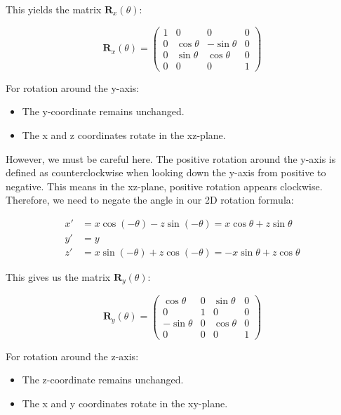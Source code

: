 \documentclass[12pt]{article}
\begin{document}
This yields the matrix $\mathbf{R}_x(\theta)$:

$$
    \mathbf{R}_x(\theta) = \begin{pmatrix}
        1 & 0          & 0           & 0 \\
        0 & \cos\theta & -\sin\theta & 0 \\
        0 & \sin\theta & \cos\theta  & 0 \\
        0 & 0          & 0           & 1
    \end{pmatrix}
$$


For rotation around the y-axis:
\begin{itemize}
    \item The y-coordinate remains unchanged.
    \item The x and z coordinates rotate in the xz-plane.
\end{itemize}

However, we must be careful here. The positive rotation around the y-axis is defined as counterclockwise when looking down the y-axis from positive to negative. This means in the xz-plane, positive rotation appears clockwise. Therefore, we need to negate the angle in our 2D rotation formula:

$$
    \begin{aligned}
        x' & = x \cos(-\theta) - z \sin(-\theta) = x \cos\theta + z \sin\theta  \\
        y' & = y                                                                \\
        z' & = x \sin(-\theta) + z \cos(-\theta) = -x \sin\theta + z \cos\theta
    \end{aligned}
$$

This gives us the matrix $\mathbf{R}_y(\theta)$:

$$
    \mathbf{R}_y(\theta) = \begin{pmatrix}
        \cos\theta  & 0 & \sin\theta & 0 \\
        0           & 1 & 0          & 0 \\
        -\sin\theta & 0 & \cos\theta & 0 \\
        0           & 0 & 0          & 1
    \end{pmatrix}
$$

For rotation around the z-axis:
\begin{itemize}
    \item The z-coordinate remains unchanged.
    \item The x and y coordinates rotate in the xy-plane.
\end{itemize}
\end{document}
